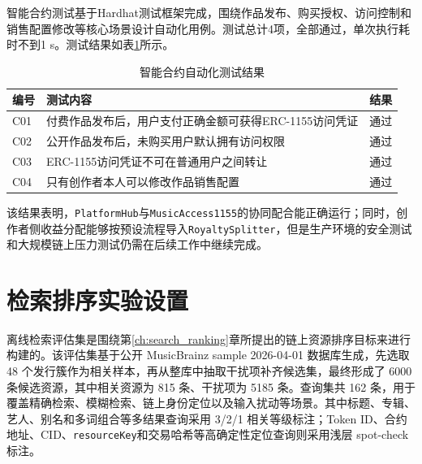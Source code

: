 智能合约测试基于Hardhat测试框架完成，围绕作品发布、购买授权、访问控制和销售配置修改等核心场景设计自动化用例。测试总计4项，全部通过，单次执行耗时不到1 s。测试结果如表\ref{tab:contract_tests}所示。

\begin{table}[htbp]
    \linespread{1.45}
    \songti
    \centering
    \caption{智能合约自动化测试结果}\label{tab:contract_tests}
    \begin{tabular}{|l|p{8.3cm}|l|}
        \hline
        编号  & 测试内容                            & 结果 \\ \hline
        C01 & 付费作品发布后，用户支付正确金额可获得ERC-1155访问凭证 & 通过 \\ \hline
        C02 & 公开作品发布后，未购买用户默认拥有访问权限           & 通过 \\ \hline
        C03 & ERC-1155访问凭证不可在普通用户之间转让         & 通过 \\ \hline
        C04 & 只有创作者本人可以修改作品销售配置               & 通过 \\ \hline
    \end{tabular}
\end{table}

该结果表明，\texttt{PlatformHub}与\texttt{MusicAccess1155}的协同配合能正确运行；同时，创作者侧收益分配能够按预设流程导入\texttt{RoyaltySplitter}，但是生产环境的安全测试和大规模链上压力测试仍需在后续工作中继续完成。


\section{检索排序实验设置}

离线检索评估集是围绕第\ref{ch:search_ranking}章所提出的链上资源排序目标来进行构建的。该评估集基于公开 MusicBrainz sample 2026-04-01 数据库生成，先选取 48 个发行簇作为相关样本，再从整库中抽取干扰项补齐候选集，最终形成了 6000 条候选资源，其中相关资源为 815 条、干扰项为 5185 条。查询集共 162 条，用于覆盖精确检索、模糊检索、链上身份定位以及输入扰动等场景。其中标题、专辑、艺人、别名和多词组合等多结果查询采用 3/2/1 相关等级标注；Token ID、合约地址、CID、\texttt{resourceKey}和交易哈希等高确定性定位查询则采用浅层 spot-check 标注。

